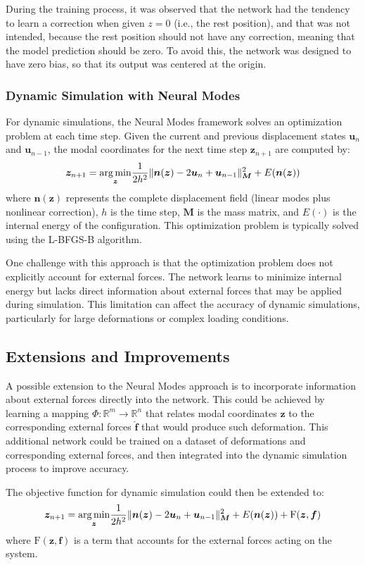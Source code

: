 During the training process, it was observed that the network had the tendency to learn a correction when given \(z = 0\) (i.e., the rest position), and that was not intended, because the rest position should not have any correction, meaning that the model prediction should be zero. To avoid this, the network was designed to have zero bias, so that its output was centered at the origin.

\subsubsection{Dynamic Simulation with Neural Modes}
For dynamic simulations, the Neural Modes framework solves an optimization problem at each time step. Given the current and previous displacement states $\bm{u}_n$ and $\bm{u}_{n-1}$, the modal coordinates for the next time step $\bm{z}_{n+1}$ are computed by:
\begin{equation}
    \bm{z}_{n+1} = \underset{\bm{z}}{\operatorname*{arg\,min}} \frac{1}{2h^2} \|\bm{n}(\bm{z}) - 2\bm{u}_n + \bm{u}_{n-1}\|_{\bm{M}}^2 + E(\bm{n}(\bm{z}))
\end{equation}
where $\bm{n}(\bm{z})$ represents the complete displacement field (linear modes plus nonlinear correction), $h$ is the time step, $\bm{M}$ is the mass matrix, and $E(\cdot)$ is the internal energy of the configuration. This optimization problem is typically solved using the L-BFGS-B algorithm.

One challenge with this approach is that the optimization problem does not explicitly account for external forces. The network learns to minimize internal energy but lacks direct information about external forces that may be applied during simulation. This limitation can affect the accuracy of dynamic simulations, particularly for large deformations or complex loading conditions.

\subsection{Extensions and Improvements}
A possible extension to the Neural Modes approach is to incorporate information about external forces directly into the network. This could be achieved by learning a mapping $\Phi: \mathbb{R}^m \rightarrow \mathbb{R}^n$ that relates modal coordinates $\bm{z}$ to the corresponding external forces $\hat{\bm{f}}$ that would produce such deformation. This additional network could be trained on a dataset of deformations and corresponding external forces, and then integrated into the dynamic simulation process to improve accuracy.

The objective function for dynamic simulation could then be extended to:
\begin{equation}
    \bm{z}_{n+1} = \underset{\bm{z}}{\operatorname*{arg\,min}} \frac{1}{2h^2} \|\bm{n}(\bm{z}) - 2\bm{u}_n + \bm{u}_{n-1}\|_{\bm{M}}^2 + E(\bm{n}(\bm{z})) + \text{F}(\bm{z}, \bm{f})
\end{equation}
where $\text{F}(\bm{z}, \bm{f})$ is a term that accounts for the external forces acting on the system.